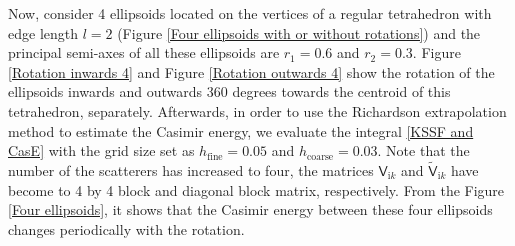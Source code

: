 Now, consider 4 ellipsoids located on the vertices of a regular tetrahedron with edge length $l = 2$ (Figure \ref{Four ellipsoids with or without rotations}) and 
the principal semi-axes of all these ellipsoids are $r_{1} = 0.6$ and $r_{2} = 0.3$. Figure \ref{Rotation inwards 4} and Figure \ref{Rotation outwards 4}
show the rotation of the ellipsoids inwards and outwards 360 degrees towards the centroid of this tetrahedron, separately. Afterwards, in order to use the Richardson extrapolation
method to estimate the Casimir energy, we evaluate the integral \eqref{KSSF and CasE} with the grid size set as $h_{\text{fine}} = 0.05$ and 
$h_{\text{coarse}} = 0.03$. Note that the number of the scatterers has increased to four, the matrices $\mathsf{V}_{\mathrm{i}k}$ and 
$\tilde{\mathsf{V}}_{\mathrm{i}k}$ have become to 4 by 4 block and diagonal block matrix, 
respectively. From the Figure \ref{Four ellipsoids}, it shows that the Casimir energy between these four ellipsoids changes periodically with the rotation.

